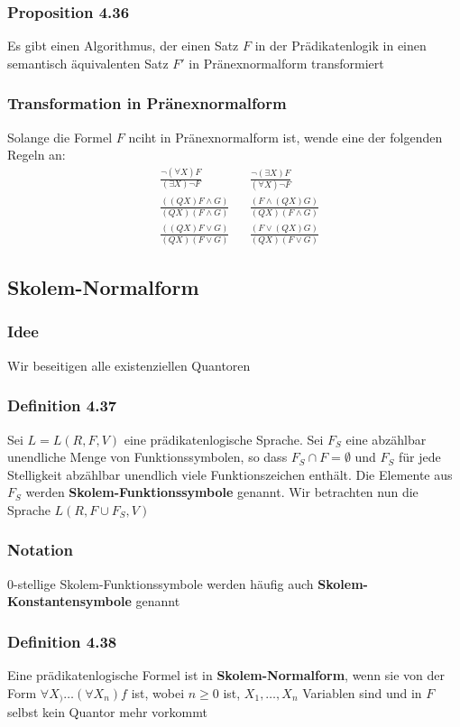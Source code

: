 \subsubsection{Proposition 4.36} 
Es gibt einen Algorithmus, der einen Satz \(F\) in der Prädikatenlogik in einen semantisch äquivalenten Satz \(F'\) in Pränexnormalform transformiert
\subsubsection{Transformation in Pränexnormalform}
Solange die Formel \(F\) nciht in Pränexnormalform ist, wende eine der folgenden Regeln an:
\begin{align*}
&\frac{\neg(\forall X)F}{(\exists X)\neg F} 
&& \frac{\neg(\exists X)F}{(\forall X)\neg F} \\
&\frac{((QX)F \wedge G)}{(QX)(F \wedge G)} 
&&\frac{(F\wedge (QX)G)}{(QX)(F\wedge G)} \\
&\frac{((QX)F\lor G)}{(QX)(F\lor G)} 
&&\frac{(F\lor (QX)G)}{(QX)(F\lor G)}
\end{align*}
\subsection{Skolem-Normalform}
\subsubsection{Idee}
Wir beseitigen alle existenziellen Quantoren
\subsubsection{Definition 4.37}
Sei \(L = L(R,F,V)\) eine prädikatenlogische Sprache. Sei \(F_S\) eine abzählbar unendliche Menge von Funktionssymbolen, so dass \(F_S \cap F = \emptyset \) und \(F_S\) für jede Stelligkeit abzählbar unendlich viele Funktionszeichen enthält. Die Elemente aus \(F_S\) werden \textbf{Skolem-Funktionssymbole} genannt. Wir betrachten nun die Sprache \(L(R,F\cup F_S, V)\)
\subsubsection{Notation}
0-stellige Skolem-Funktionssymbole werden häufig auch \textbf{Skolem-Konstantensymbole} genannt
\subsubsection{Definition 4.38}
Eine prädikatenlogische Formel ist in \textbf{Skolem-Normalform}, wenn sie von der Form \(\forall X_	) \ldots (\forall X_n)f\) ist, wobei \(n\geq 0\) ist, \(X_1 ,\ldots ,X_n\) Variablen sind und in \(F\) selbst kein Quantor mehr vorkommt
